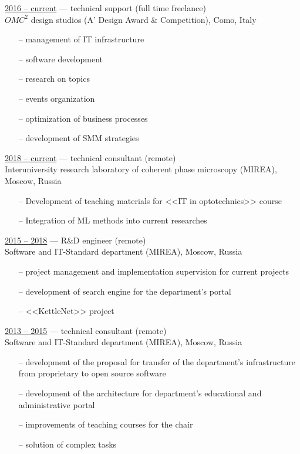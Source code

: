 \documentclass[a4paper,10pt,fullpage]{article}
\begin{document}
\underline{2016 -- current} --- technical support (full time freelance)\\
$ OMC^{2} $ design studios (A' Design Award \& Competition), Como, Italy
\begin{itemize}
	\item[--] management of IT infrastructure
	\item[--] software development
	\item[--] research on topics
	\item[--] events organization 
	\item[--] optimization of business processes
	\item[--] development of SMM strategies \\
\end{itemize}

\underline{2018 -- current} --- technical consultant (remote)\\
Interuniversity research laboratory of coherent phase microscopy (MIREA), Moscow, Russia
\begin{itemize}
	\item[--] Development of teaching materials for <<IT in optotechnics>> course
	\item[--] Integration of ML methods into current researches \\
\end{itemize}

\underline{2015 -- 2018} --- R\&D engineer (remote)\\
Software and IT-Standard department (MIREA), Moscow, Russia
\begin{itemize}
	\item[--] project management and implementation supervision for current projects
	\item[--] development of search engine for the department's portal
	\item[--] <<KettleNet>> project\\
\end{itemize}

\underline{2013 -- 2015} ---  technical consultant (remote)\\
Software and IT-Standard department (MIREA), Moscow, Russia
\begin{itemize}
	\item[--] development of the proposal for transfer of the department's infrastructure from proprietary to 
	open source software
	\item[--] development of the architecture for department's educational and administrative portal
	\item[--] improvements of teaching courses for the chair
	\item[--] solution of complex tasks \\
\end{itemize}
\end{document}
